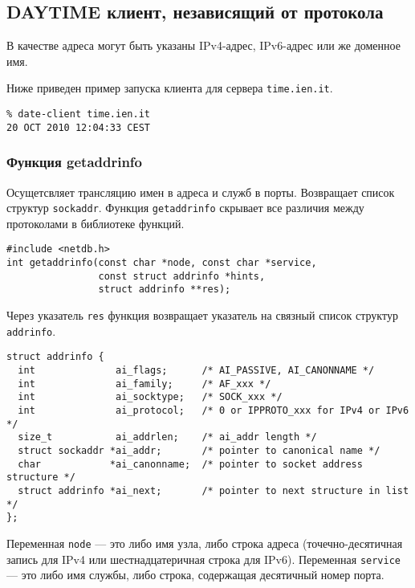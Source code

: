 \subsection{DAYTIME клиент, независящий от протокола}
В качестве адреса могут быть указаны IPv4-адрес, IPv6-адрес или же доменное имя.

\lstset{label=lst:date-client,caption=DAYTIME клиент}


Ниже приведен пример запуска клиента для сервера \texttt{time.ien.it}.
\lstset{language=,label=lst:client-run,caption=Использование}
\begin{lstlisting}
% date-client time.ien.it
20 OCT 2010 12:04:33 CEST
\end{lstlisting}

\subsubsection{Функция getaddrinfo}
Осущетсвляет трансляцию имен в адреса и служб в порты. Возвращает список структур \lstinline{sockaddr}. Функция \lstinline{getaddrinfo} скрывает все различия между протоколами в библиотеке функций.

\lstset{language=C,caption=}
\begin{lstlisting}
#include <netdb.h>
int getaddrinfo(const char *node, const char *service,
                const struct addrinfo *hints,
                struct addrinfo **res);
\end{lstlisting}

Через указатель \lstinline{res} функция возвращает указатель на связный список структур \lstinline{addrinfo}.
\lstset{language=C,caption=}
\begin{lstlisting}
struct addrinfo {
  int              ai_flags;      /* AI_PASSIVE, AI_CANONNAME */
  int              ai_family;     /* AF_xxx */
  int              ai_socktype;   /* SOCK_xxx */
  int              ai_protocol;   /* 0 or IPPROTO_xxx for IPv4 or IPv6 */
  size_t           ai_addrlen;    /* ai_addr length */
  struct sockaddr *ai_addr;       /* pointer to canonical name */
  char            *ai_canonname;  /* pointer to socket address structure */
  struct addrinfo *ai_next;       /* pointer to next structure in list */
};
\end{lstlisting}

Переменная \lstinline{node} --- это либо имя узла, либо строка адреса (точечно-десятичная запись для IPv4 или шестнадцатеричная строка для IPv6). Переменная \lstinline{service} --- это либо имя службы, либо строка, содержащая десятичный номер порта.

